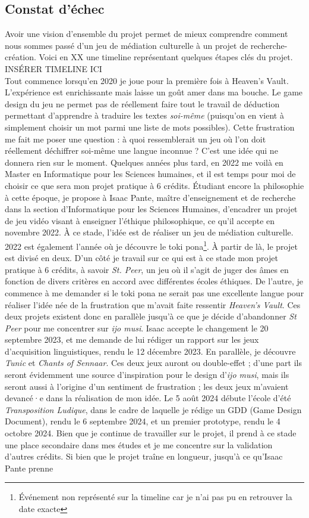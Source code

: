 \documentclass{scrartcl}
\begin{document}
	\subsection*{Constat d'échec}
	Avoir une vision d'ensemble du projet permet de mieux comprendre comment nous sommes passé d'un jeu de médiation culturelle à un projet de recherche-création. Voici en XX une timeline représentant quelques étapes clés du projet.\\
	INSÉRER TIMELINE ICI\\
	Tout commence lorsqu'en 2020 je joue pour la première fois à Heaven's Vault. L'expérience est enrichissante mais laisse un goût amer dans ma bouche. Le game design du jeu ne permet pas de réellement faire tout le travail de déduction permettant d'apprendre à traduire les textes \textit{soi-même} (puisqu'on en vient à simplement choisir un mot parmi une liste de mots possibles). Cette frustration me fait me poser une question : à quoi ressemblerait un jeu où l'on doit réellement déchiffrer soi-même une langue inconnue ? C'est une idée qui ne donnera rien sur le moment. Quelques années plus tard, en 2022 me voilà en Master en Informatique pour les Sciences humaines, et il est temps pour moi de choisir ce que sera mon projet pratique à 6 crédits. Étudiant encore la philosophie à cette époque, je propose à Isaac Pante, maître d'enseignement et de recherche dans la section d'Informatique pour les Sciences Humaines, d'encadrer un projet de jeu vidéo visant à enseigner l'éthique philosophique, ce qu'il accepte en novembre 2022. À ce stade, l'idée est de réaliser un jeu de médiation culturelle. 2022 est également l'année où je découvre le toki pona\footnote{Événement non représenté sur la timeline car je n'ai pas pu en retrouver la date exacte}. À partir de là, le projet est divisé en deux. D'un côté je travail sur ce qui est à ce stade mon projet pratique à 6 crédits, à savoir \textit{St. Peer}, un jeu où il s'agit de juger des âmes en fonction de divers critères en accord avec différentes écoles éthiques. De l'autre, je commence à me demander si le toki pona ne serait pas une excellente langue pour réaliser l'idée née de la frustration que m'avait faite ressentir \textit{Heaven's Vault}. Ces deux projets existent donc en parallèle jusqu'à ce que je décide d'abandonner \textit{St Peer} pour me concentrer sur \textit{ijo musi}. Isaac accepte le changement le 20 septembre 2023, et me demande de lui rédiger un rapport sur les jeux d'acquisition linguistiques, rendu le 12 décembre 2023. En parallèle, je découvre \textit{Tunic} et \textit{Chants of Sennaar}. Ces deux jeux auront ou double-effet ; d'une part ils seront évidemment une source d'inspiration pour le design d'\textit{ijo musi}, mais ils seront aussi à l'origine d'un sentiment de frustration ; les deux jeux m'avaient devancé·e dans la réalisation de mon idée. Le 5 août 2024 débute l'école d'été \textit{Transposition Ludique}, dans le cadre de laquelle je rédige un GDD (Game Design Document), rendu le 6 septembre 2024, et un premier prototype, rendu le 4 octobre 2024. Bien que je continue de travailler sur le projet, il prend à ce stade une place secondaire dans mes études et je me concentre sur la validation d'autres crédits. Si bien que le projet traîne en longueur, jusqu'à ce qu'Isaac Pante prenne 
\end{document}
